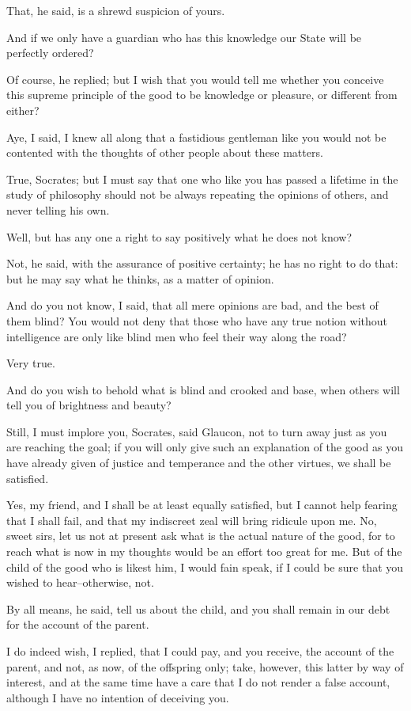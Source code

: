 That, he said, is a shrewd suspicion of yours.

And if we only have a guardian who has this knowledge our State will be
perfectly ordered?

Of course, he replied; but I wish that you would tell me whether you
conceive this supreme principle of the good to be knowledge or pleasure,
or different from either?

Aye, I said, I knew all along that a fastidious gentleman like you would
not be contented with the thoughts of other people about these matters.

True, Socrates; but I must say that one who like you has passed a
lifetime in the study of philosophy should not be always repeating the
opinions of others, and never telling his own.

Well, but has any one a right to say positively what he does not know?

Not, he said, with the assurance of positive certainty; he has no right
to do that: but he may say what he thinks, as a matter of opinion.

And do you not know, I said, that all mere opinions are bad, and the
best of them blind? You would not deny that those who have any true
notion without intelligence are only like blind men who feel their way
along the road?

Very true.

And do you wish to behold what is blind and crooked and base, when
others will tell you of brightness and beauty?

Still, I must implore you, Socrates, said Glaucon, not to turn away just
as you are reaching the goal; if you will only give such an explanation
of the good as you have already given of justice and temperance and the
other virtues, we shall be satisfied.

Yes, my friend, and I shall be at least equally satisfied, but I cannot
help fearing that I shall fail, and that my indiscreet zeal will bring
ridicule upon me. No, sweet sirs, let us not at present ask what is the
actual nature of the good, for to reach what is now in my thoughts
would be an effort too great for me. But of the child of the good who
is likest him, I would fain speak, if I could be sure that you wished to
hear--otherwise, not.

By all means, he said, tell us about the child, and you shall remain in
our debt for the account of the parent.

I do indeed wish, I replied, that I could pay, and you receive, the
account of the parent, and not, as now, of the offspring only; take,
however, this latter by way of interest, and at the same time have a
care that I do not render a false account, although I have no intention
of deceiving you.

